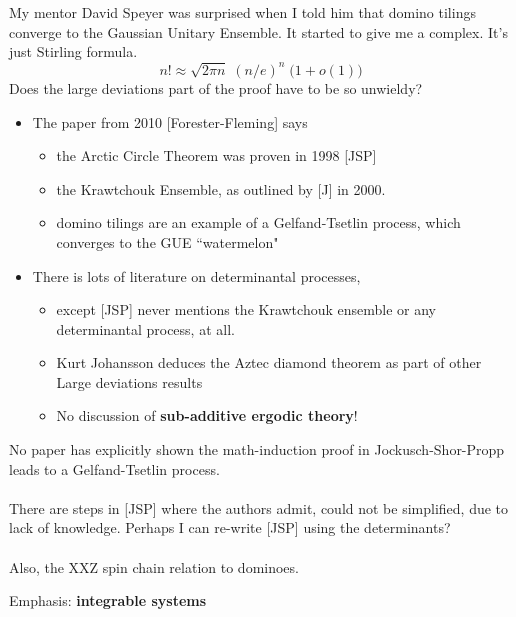 \documentclass[12pt]{article}
\begin{document}
\newpage

\noindent My mentor David Speyer was surprised when I told him that domino tilings converge to the Gaussian Unitary Ensemble.  It started to give me a complex.  It's just Stirling formula.
$$ n! \approx \sqrt{2\pi n} \;(n/e)^n \; \big(1 + o(1) \big)$$
Does the large deviations part of the proof have to be so unwieldy?  
\begin{itemize}
\item The paper from 2010 [Forester-Fleming] says 
\begin{itemize} 
\item the Arctic Circle Theorem was proven in 1998 [JSP] 
\item the Krawtchouk Ensemble, as outlined by [J] in 2000.
\item domino tilings are an example of a Gelfand-Tsetlin process, which converges to the GUE ``watermelon" 
\end{itemize}  
\item  There is lots of literature on determinantal processes, 
\begin{itemize}
\item except [JSP] never mentions the Krawtchouk ensemble or any determinantal process, at all.
\item Kurt Johansson deduces the Aztec diamond theorem as part of other Large deviations results
\item No discussion of \textbf{sub-additive ergodic theory}!
\end{itemize}
\end{itemize}
No paper has explicitly shown the math-induction proof in Jockusch-Shor-Propp leads to a Gelfand-Tsetlin process.  \\ \\ There are steps in [JSP] where the authors admit, could not be simplified, due to lack of knowledge.  Perhaps I can re-write [JSP] using the determinants?
\\ \\
Also, the XXZ spin chain relation to dominoes.

\newpage

\noindent Emphasis:  \textbf{integrable systems}


\selectfont \fontsize{12}{10}\selectfont
\end{document}
